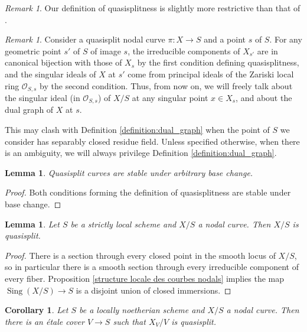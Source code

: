 \documentclass[a4paper,12pt]{amsart} %
\numberwithin{equation}{subsection}
\def\Sing{\operatorname{Sing}}
\theoremstyle{definition}
\theoremstyle{plain}%
\newtheorem{lemma}[definition]{Lemma}
\newtheorem{corollary}[definition]{Corollary}
\theoremstyle{remark}
\newtheorem{remark}[definition]{Remark}
\renewcommand{\O}{\mathcal{O}}
\begin{document}
\begin{remark}
Our definition of quasisplitness is slightly more restrictive than that of \cite{HolmesUniversalJacobian}.
\end{remark}

\begin{remark}\label{remark:Zariski_dual_graphs_of_QS_curves}
Consider a quasisplit nodal curve $\pi\colon X \to S$ and a point $s$ of $S$. For any geometric point $s'$ of $S$ of image $s$, the irreducible components of $X_{s'}$ are in canonical bijection with those of $X_s$ by the first condition defining quasisplitness, and the singular ideals of $X$ at $s'$ come from principal ideals of the Zariski local ring $\O_{S,s}$ by the second condition. Thus, from now on, we will freely talk about the singular ideal (in $\O_{S,s}$) of $X/S$ at any singular point $x\in X_s$, and about the dual graph of $X$ at $s$.

This may clash with Definition \ref{definition:dual_graph} when the point of $S$ we consider has separably closed residue field. Unless specified otherwise, when there is an ambiguity, we will always privilege Definition \ref{definition:dual_graph}.
\end{remark}

\begin{lemma}
Quasisplit curves are stable under arbitrary base change.
\end{lemma}

\begin{proof}
Both conditions forming the definition of quasisplitness are stable under base change.
\end{proof}

\begin{lemma}\label{lemma:quasisplit_if_base_strictly_local}
Let $S$ be a strictly local scheme and $X/S$ a nodal curve. Then $X/S$ is quasisplit.
\end{lemma}

\begin{proof}
There is a section through every closed point in the smooth locus of $X/S$, so in particular there is a smooth section through every irreducible component of every fiber. Proposition \ref{structure locale des courbes nodals} implies the map $\Sing(X/S)\to S$ is a disjoint union of closed immersions.
\end{proof}

\begin{corollary}\label{corollary:curves_are_QS_over_some_etale_cover}
Let $S$ be a locally noetherian scheme and $X/S$ a nodal curve. Then there is an \'etale cover $V \to S$ such that $X_V/V$ is quasisplit.
\end{corollary}
\end{document}
